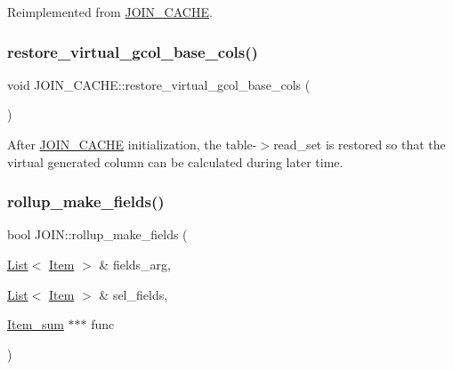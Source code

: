 Reimplemented from \mbox{\hyperlink{group__Query__Optimizer_gad54e309ac7f0fd377d7a422ea54f59f8}{J\+O\+I\+N\+\_\+\+C\+A\+C\+HE}}.

\mbox{\label{group__Query__Optimizer_gabfdf6220265d56c5dc44081d89abc73e}} 
\subsubsection{\texorpdfstring{restore\+\_\+virtual\+\_\+gcol\+\_\+base\+\_\+cols()}{restore\_virtual\_gcol\_base\_cols()}}
{\footnotesize\ttfamily void J\+O\+I\+N\+\_\+\+C\+A\+C\+H\+E\+::restore\+\_\+virtual\+\_\+gcol\+\_\+base\+\_\+cols (\begin{DoxyParamCaption}{ }\end{DoxyParamCaption})\hspace{0.3cm}{\ttfamily [protected]}}

After \mbox{\hyperlink{classJOIN__CACHE}{J\+O\+I\+N\+\_\+\+C\+A\+C\+HE}} initialization, the table-\/$>$read\+\_\+set is restored so that the virtual generated column can be calculated during later time. \mbox{\label{group__Query__Optimizer_ga7e92b14b52e210ce225ad4c0312f9bca}} 
\subsubsection{\texorpdfstring{rollup\+\_\+make\+\_\+fields()}{rollup\_make\_fields()}}
{\footnotesize\ttfamily bool J\+O\+I\+N\+::rollup\+\_\+make\+\_\+fields (\begin{DoxyParamCaption}\item[{\mbox{\hyperlink{classList}{List}}$<$ \mbox{\hyperlink{classItem}{Item}} $>$ \&}]{fields\+\_\+arg,  }\item[{\mbox{\hyperlink{classList}{List}}$<$ \mbox{\hyperlink{classItem}{Item}} $>$ \&}]{sel\+\_\+fields,  }\item[{\mbox{\hyperlink{classItem__sum}{Item\+\_\+sum}} $\ast$$\ast$$\ast$}]{func }\end{DoxyParamCaption})}

